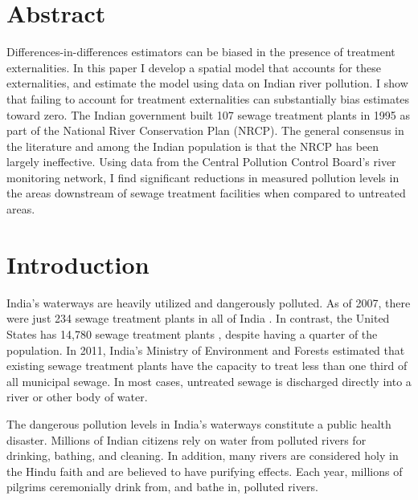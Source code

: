 \documentclass[12pt]{article}
\begin{document}
\maketitle



\section*{Abstract}
\singlespacing
Differences-in-differences estimators can be biased in the presence of treatment externalities. In this paper I develop a spatial model that accounts for these externalities, and estimate the model using data on Indian river pollution. I show that failing to account for treatment externalities can substantially bias estimates toward zero.
The Indian government built 107 sewage treatment plants in 1995 as part of the National River Conservation Plan (NRCP). The general consensus in the literature and among the Indian population is that the NRCP has been largely ineffective. Using data from the Central Pollution Control Board's river monitoring network, I find significant reductions in measured pollution levels in the areas downstream of sewage treatment facilities when compared to untreated areas. 

\pagebreak 

\doublespacing

\section{Introduction} \label{sec:intro}


India's waterways are heavily utilized and dangerously polluted. As of 2007, there were just 234 sewage treatment plants in all of India \citep{cpcb2008}. In contrast, the United States has 14,780 sewage treatment plants , despite having a quarter of the population. In 2011, India's Ministry of Environment and Forests estimated that existing sewage treatment plants have the capacity to treat less than one third of all municipal sewage. In most cases, untreated sewage is discharged directly into a river or other body of water. 

The dangerous pollution levels in India's waterways constitute a public health disaster. Millions of Indian citizens rely on water from polluted rivers for drinking, bathing, and cleaning. In addition, many rivers are considered holy in the Hindu faith and are believed to have purifying effects. Each year, millions of pilgrims ceremonially drink from, and bathe in, polluted rivers. 
\end{document}

